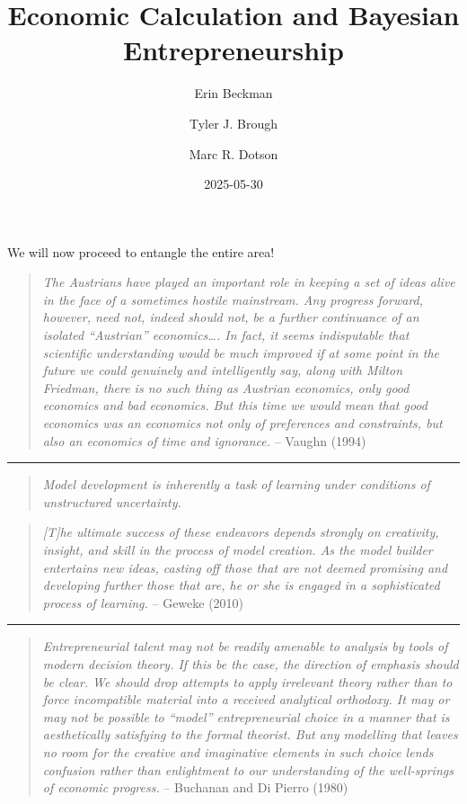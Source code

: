 \documentclass[
  letterpaper,
  DIV=11,
  numbers=noendperiod]{scrartcl}
\title{Economic Calculation and Bayesian Entrepreneurship}
\author{Erin Beckman \and Tyler J. Brough \and Marc R. Dotson}
\date{2025-05-30}
\begin{document}
\maketitle


We will now proceed to entangle the entire area!

\newpage

\begin{quote}
\emph{The Austrians have played an important role in keeping a set of
ideas alive in the face of a sometimes hostile mainstream. Any progress
forward, however, need not, indeed should not, be a further continuance
of an isolated ``Austrian'' economics\ldots. In fact, it seems
indisputable that scientific understanding would be much improved if at
some point in the future we could genuinely and intelligently say, along
with Milton Friedman, there is no such thing as Austrian economics, only
good economics and bad economics. But this time we would mean that good
economics was an economics not only of preferences and constraints, but
also an economics of time and ignorance.} -- Vaughn (1994)
\end{quote}

\begin{center}\rule{0.5\linewidth}{0.5pt}\end{center}

\begin{quote}
\emph{Model development is inherently a task of learning under
conditions of unstructured uncertainty.}
\end{quote}

\begin{quote}
\emph{{[}T{]}he ultimate success of these endeavors depends strongly on
creativity, insight, and skill in the process of model creation. As the
model builder entertains new ideas, casting oﬀ those that are not deemed
promising and developing further those that are, he or she is engaged in
a sophisticated process of learning.} -- Geweke (2010)
\end{quote}

\begin{center}\rule{0.5\linewidth}{0.5pt}\end{center}

\begin{quote}
\emph{Entrepreneurial talent may not be readily amenable to analysis by
tools of modern decision theory. If this be the case, the direction of
emphasis should be clear. We should drop attempts to apply irrelevant
theory rather than to force incompatible material into a received
analytical orthodoxy. It may or may not be possible to ``model''
entrepreneurial choice in a manner that is aesthetically satisfying to
the formal theorist. But any modelling that leaves no room for the
creative and imaginative elements in such choice lends confusion rather
than enlightment to our understanding of the well-springs of economic
progress.} -- Buchanan and Di Pierro (1980)
\end{quote}
\end{document}
